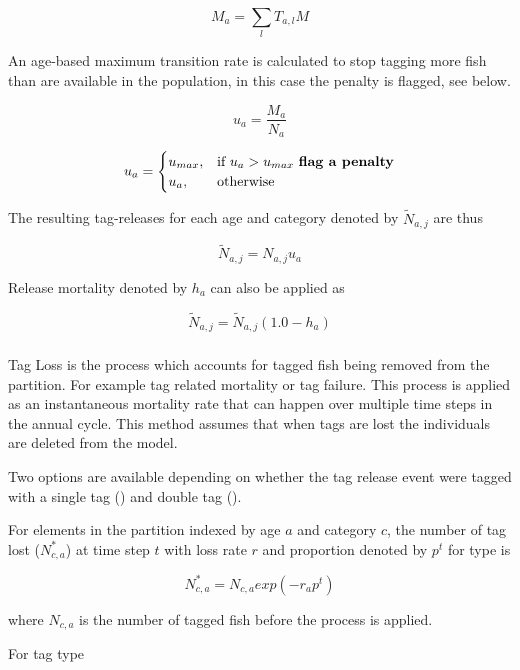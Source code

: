 $$ M_{a} = \sum_l T_{a,l}M  $$

An age-based maximum transition rate is calculated to stop tagging more fish than are available in the population, in this case the penalty is flagged, see below.

$$ u_{a} = \frac{ M_{a} }{ N_{a}}  $$

$$
u_{a} =
\begin{cases}
u_{max},& \text{if } u_{a} > u_{max} \text{ \textbf{flag a penalty}}\\
u_{a},  & \text{otherwise}
\end{cases}
$$

The resulting tag-releases for each age and category denoted by \(\widetilde{N}_{a,j}\) are thus

$$
\widetilde{N}_{a,j} = N_{a,j} u_{a}
$$

Release mortality denoted by \(h_a\) can also be applied as

$$\widetilde{N}_{a,j} = \widetilde{N}_{a,j}\left(1.0 - h_a\right)$$

\subsubsection{}\label{sec:Process-TagLoss} 

Tag Loss is the process which accounts for tagged fish being removed from the partition. For example tag related mortality or tag failure. This process is applied as an instantaneous mortality rate that can happen over multiple time steps in the annual cycle. This method assumes that when tags are lost the individuals are deleted from the model.

Two options are available depending on whether the tag release event were tagged with a single tag () and double tag ().

For elements in the partition indexed by age \(a\) and category \(c\), the number of tag lost (\(N^*_{c,a}\)) at time step \(t\) with loss rate \(r\) and proportion denoted by \(p^t\) for type  is

\begin{equation}
	N^*_{c,a} = N_{c,a} exp\left( - r_a p^t\right)
\end{equation}

where \(N_{c,a}\) is the number of tagged fish before the process is applied.

For tag type 

